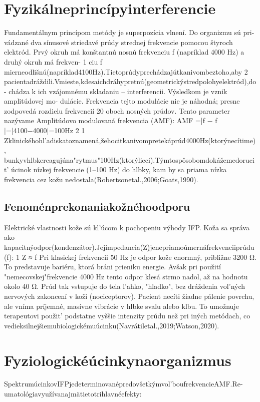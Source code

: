 \section{Fyzikálneprincípyinterferencie}

Fundamentálnym princípom metódy je superpozícia vlnení. Do organizmu sú pri- vádzané dva sínusové striedavé prúdy strednej frekvencie pomocou štyroch elektród. Prvý okruh má konštantnú nosnú frekvenciu f (napríklad 4000 Hz) a druhý okruh má frekven- 1 ciu f mierneodlišnú(napríklad4100Hz).Tietoprúdyprechádzajútkanivombeztoho,aby 2 pacientadráždili.Vmieste,kdesaichdráhypretnú(geometrickýstredpolohyelektród),do- chádza k ich vzájomnému skladaniu -- interferencii. Výsledkom je vznik amplitúdovej mo- dulácie. Frekvencia tejto modulácie nie je náhodná; presne zodpovedá rozdielu frekvencií 20 oboch nosných prúdov. Tento parameter nazývame Amplitúdovo modulovaná frekvencia (AMF): AMF =|f − f |=|4100−4000|=100Hz 2 1 Zklinickéhohl’adiskatoznamená,žehocitkanivompretekáprúd4000Hz(ktorýnecítime), bunkyvhlbkereagujúna"rytmus"100Hz(ktorýlieci).Týmtospôsobomdokážemedorucit’ úcinok nízkej frekvencie (1--100 Hz) do hlbky, kam by sa priama nízka frekvencia cez kožu nedostala(Robertsonetal.,2006;Goats,1990).


\subsection{Fenoménprekonaniakožnéhoodporu}

Elektrické vlastnosti kože sú kl’úcom k pochopeniu výhody IFP. Koža sa správa ako kapacitnýodpor(kondenzátor).Jejimpedancia(Z)jenepriamoúmernáfrekvenciiprúdu(f): 1 Z ≈ f Pri klasickej frekvencii 50 Hz je odpor kože enormný, približne 3200 Ω. To predstavuje bariéru, ktorá bráni prieniku energie. Avšak pri použití "nemecovskej"frekvencie 4000 Hz tento odpor klesá strmo nadol, až na hodnotu okolo 40 Ω. Prúd tak vstupuje do tela l’ahko, "hladko", bez dráždenia vol’ných nervových zakoncení v koži (nociceptorov). Pacient necíti žiadne pálenie povrchu, ale vníma príjemné, masívne vibrácie v hlbke svalu alebo klbu. To umožnuje terapeutovi použit’ podstatne vyššie intenzity prúdu než pri iných metódach, co vedieksilnejšiemubiologickémuúcinku(Navrátiletal.,2019;Watson,2020).


\section{Fyziologickéúcinkynaorganizmus}

SpektrumúcinkovIFPjedeterminovanépredovšetkýmvol’boufrekvencieAMF.Re- umatológiavyužívanajmätietotrihlavnéefekty:



